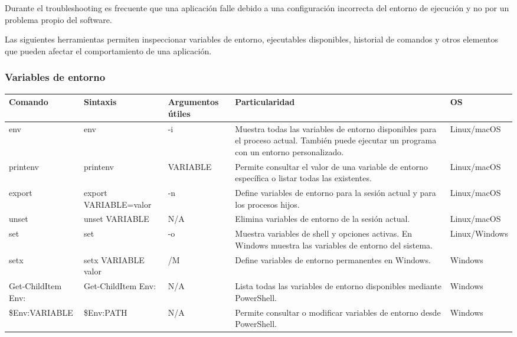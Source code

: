 \documentclass[a4paper,10pt]{article}
\begin{document}
Durante el troubleshooting es frecuente que una aplicación falle debido a una
configuración incorrecta del entorno de ejecución y no por un problema propio
del software.

Las siguientes herramientas permiten inspeccionar variables de entorno,
ejecutables disponibles, historial de comandos y otros elementos que pueden
afectar el comportamiento de una aplicación.


\subsubsection{Variables de entorno}

\begin{longtable}{|p{2.8cm}|p{3.3cm}|p{4cm}|p{5.3cm}|p{1.5cm}|}

\hline
Comando &
Sintaxis &
Argumentos útiles &
Particularidad &
OS
\\
\hline
\endhead

env &
env &
-i &
Muestra todas las variables de entorno disponibles para el proceso actual. También puede ejecutar un programa con un entorno personalizado. &
Linux/macOS
\\
\hline

printenv &
printenv &
VARIABLE &
Permite consultar el valor de una variable de entorno específica o listar todas las existentes. &
Linux/macOS
\\
\hline

export &
export VARIABLE=valor &
-n &
Define variables de entorno para la sesión actual y para los procesos hijos. &
Linux/macOS
\\
\hline

unset &
unset VARIABLE &
N/A &
Elimina variables de entorno de la sesión actual. &
Linux/macOS
\\
\hline

set &
set &
-o &
Muestra variables de shell y opciones activas. En Windows muestra las variables de entorno del sistema. &
Linux/Windows
\\
\hline

setx &
setx VARIABLE valor &
/M &
Define variables de entorno permanentes en Windows. &
Windows
\\
\hline

Get-ChildItem Env: &
Get-ChildItem Env: &
N/A &
Lista todas las variables de entorno disponibles mediante PowerShell. &
Windows
\\
\hline

\$Env:VARIABLE &
\$Env:PATH &
N/A &
Permite consultar o modificar variables de entorno desde PowerShell. &
Windows
\\
\hline

\end{longtable}
\end{document}
